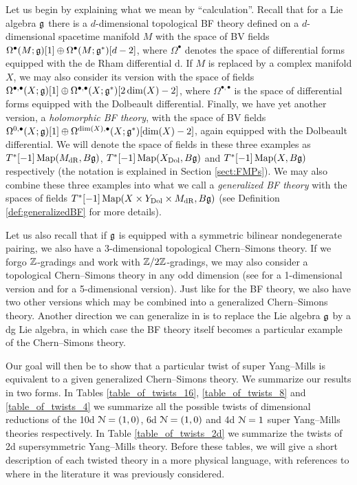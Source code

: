 \documentclass[10pt, oneside]{article}
\begin{document}
Let us begin by explaining what we mean by ``calculation''. Recall that for a Lie algebra $\mathfrak g$ there is a $d$-dimensional topological BF theory defined on a $d$-dimensional spacetime manifold $M$ with the space of BV fields $\Omega^\bullet(M; \mathfrak g)[1]\oplus \Omega^\bullet(M; \mathfrak g^*)[d-2]$, where $\Omega^\bullet$ denotes the space of differential forms equipped with the de Rham differential $\mathrm{d}$. If $M$ is replaced by a complex manifold $X$, we may also consider its version with the space of fields $\Omega^{\bullet, \bullet}(X; \mathfrak g)[1]\oplus \Omega^{\bullet, \bullet}(X; \mathfrak g^*)[2\dim(X)-2]$, where $\Omega^{\bullet, \bullet}$ is the space of differential forms equipped with the Dolbeault differential. Finally, we have yet another version, a \emph{holomorphic BF theory}, with the space of BV fields $\Omega^{0, \bullet}(X; \mathfrak g)[1]\oplus \Omega^{\dim(X), \bullet}(X; \mathfrak g^*)[\dim(X)-2]$, again equipped with the Dolbeault differential. We will denote the space of fields in these three examples as $T^*[-1]\operatorname{Map}(M_{\mathrm{dR}}, B\mathfrak g)$, $T^*[-1]\operatorname{Map}(X_{\mathrm{Dol}}, B\mathfrak g)$ and $T^*[-1]\operatorname{Map}(X, B\mathfrak g)$ respectively (the notation is explained in Section \ref{sect:FMPs}). We may also combine these three examples into what we call a \emph{generalized BF theory} with the spaces of fields $T^*[-1]\operatorname{Map}(X\times Y_{\mathrm{Dol}}\times M_{\mathrm{dR}}, B\mathfrak g)$ (see Definition \ref{def:generalizedBF} for more details).

Let us also recall that if $\mathfrak g$ is equipped with a symmetric bilinear nondegenerate pairing, we also have a 3-dimensional topological Chern--Simons theory. If we forgo $\mathbb Z$-gradings and work with $\mathbb Z/2\mathbb Z$-gradings, we may also consider a topological Chern--Simons theory in any odd dimension (see \cite{AlekseevMnev} for a 1-dimensional version and \cite{BakGustavsson2} for a 5-dimensional version). Just like for the BF theory, we also have two other versions which may be combined into a generalized Chern--Simons theory. Another direction we can generalize in is to replace the Lie algebra $\mathfrak g$ by a dg Lie algebra, in which case the BF theory itself becomes a particular example of the Chern--Simons theory.

Our goal will then be to show that a particular twist of super Yang--Mills is equivalent to a given generalized Chern--Simons theory. We summarize our results in two forms. In Tables \ref{table_of_twists_16}, \ref{table_of_twists_8} and \ref{table_of_twists_4} we summarize all the possible twists of dimensional reductions of the 10d $\mathcal N=(1, 0)$, 6d $\mathcal N=(1, 0)$ and 4d $\mathcal N=1$ super Yang--Mills theories respectively.  In Table \ref{table_of_twists_2d} we summarize the twists of 2d supersymmetric Yang--Mills theory. Before these tables, we will give a short description of each twisted theory in a more physical language, with references to where in the literature it was previously considered.
\end{document}
